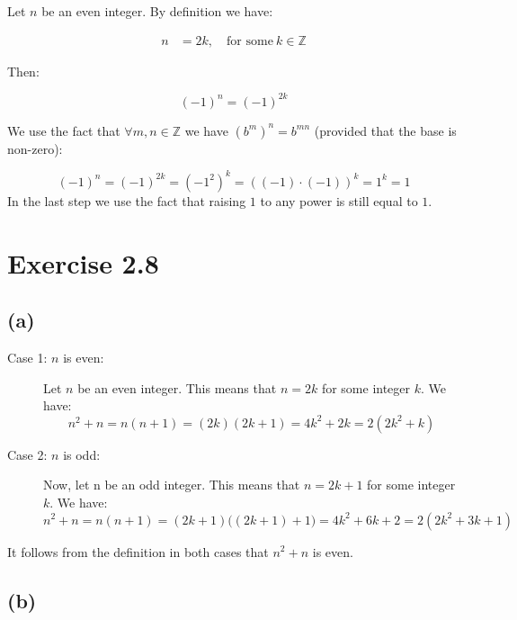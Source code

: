 \documentclass{article}
\begin{document}
Let $n$ be an even integer. By definition we have:

\begin{align*}
	n &= 2k, \quad \mbox{for some}\ k \in \mathbb{Z}
\end{align*}

Then:

\begin{equation*}
	(-1)^n = (-1)^{2k}
\end{equation*}

We use the fact that $\forall m,n \in \mathbb{Z}$ we have $(b^m)^n = b^{mn}$
(provided that the base is non-zero):

\begin{equation*}
	(-1)^n = (-1)^{2k} = (-1^2)^k = ((-1) \cdot (-1))^{k} = 1^k = 1
\end{equation*}
\noindent
In the last step we use the fact that raising $1$
to any power is still equal to $1$. 


\section*{Exercise 2.8}

\subsection*{(a)}

\begin{description}
    \item[Case 1: $n$ is even:]
	    Let $n$ be an even integer. This means that $n = 2k$ for some
	    integer $k$. We have:
	    \begin{equation*}
		n^2 + n = n(n+1) = (2k)(2k + 1) = 4k^{2} + 2k = 2(2k^2 + k)
	    \end{equation*}
    \item[Case 2: $n$ is odd:] Now, let n be an odd integer. This means that $n
	    = 2k + 1$ for some integer $k$. We have:
	    \begin{equation*}
		n^2 + n = n(n+1) = (2k +1)\big((2k + 1) + 1 \big) = 4k^2 + 6k + 2 = 2(2k^2 + 3k + 1)
	    \end{equation*}
\end{description}

It follows from the definition in both cases that $n^2 +n$ is even.


\subsection*{(b)}
\end{document}
